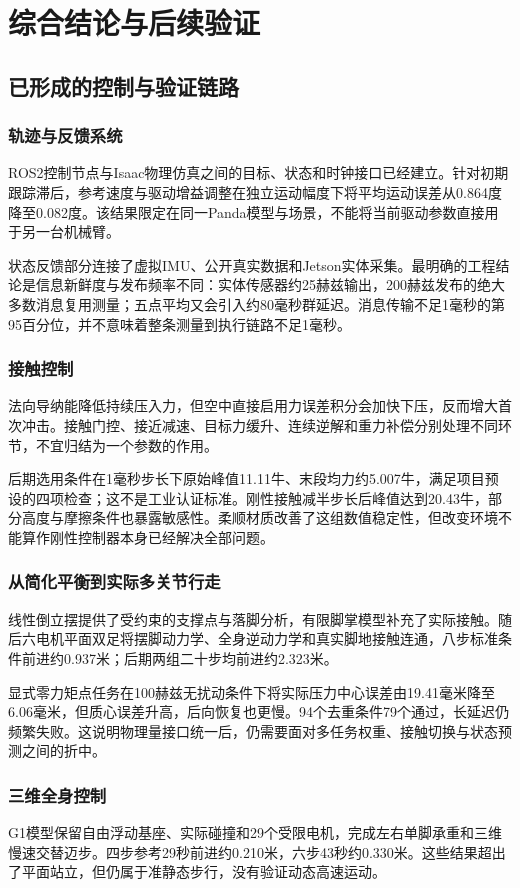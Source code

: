 \chapter{综合结论与后续验证}
\section{已形成的控制与验证链路}
\subsection{轨迹与反馈系统}
ROS2控制节点与Isaac物理仿真之间的目标、状态和时钟接口已经建立。针对初期跟踪滞后，参考速度与驱动增益调整在独立运动幅度下将平均运动误差从0.864度降至0.082度。该结果限定在同一Panda模型与场景，不能将当前驱动参数直接用于另一台机械臂。

状态反馈部分连接了虚拟IMU、公开真实数据和Jetson实体采集。最明确的工程结论是信息新鲜度与发布频率不同：实体传感器约25赫兹输出，200赫兹发布的绝大多数消息复用测量；五点平均又会引入约80毫秒群延迟。消息传输不足1毫秒的第95百分位，并不意味着整条测量到执行链路不足1毫秒。
\subsection{接触控制}
法向导纳能降低持续压入力，但空中直接启用力误差积分会加快下压，反而增大首次冲击。接触门控、接近减速、目标力缓升、连续逆解和重力补偿分别处理不同环节，不宜归结为一个参数的作用。

后期选用条件在1毫秒步长下原始峰值11.11牛、末段均力约5.007牛，满足项目预设的四项检查；这不是工业认证标准。刚性接触减半步长后峰值达到20.43牛，部分高度与摩擦条件也暴露敏感性。柔顺材质改善了这组数值稳定性，但改变环境不能算作刚性控制器本身已经解决全部问题。
\subsection{从简化平衡到实际多关节行走}
线性倒立摆提供了受约束的支撑点与落脚分析，有限脚掌模型补充了实际接触。随后六电机平面双足将摆脚动力学、全身逆动力学和真实脚地接触连通，八步标准条件前进约0.937米；后期两组二十步均前进约2.323米。

显式零力矩点任务在100赫兹无扰动条件下将实际压力中心误差由19.41毫米降至6.06毫米，但质心误差升高，后向恢复也更慢。94个去重条件79个通过，长延迟仍频繁失败。这说明物理量接口统一后，仍需要面对多任务权重、接触切换与状态预测之间的折中。
\subsection{三维全身控制}
G1模型保留自由浮动基座、实际碰撞和29个受限电机，完成左右单脚承重和三维慢速交替迈步。四步参考29秒前进约0.210米，六步43秒约0.330米。这些结果超出了平面站立，但仍属于准静态步行，没有验证动态高速运动。

